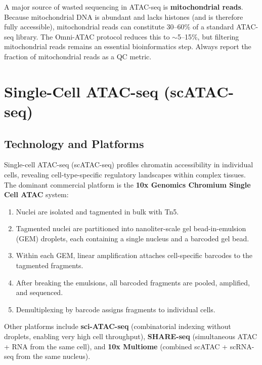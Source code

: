 \begin{warningbox}
A major source of wasted sequencing in ATAC-seq is \textbf{mitochondrial reads}. Because mitochondrial DNA is abundant and lacks histones (and is therefore fully accessible), mitochondrial reads can constitute 30--60\% of a standard ATAC-seq library. The Omni-ATAC protocol reduces this to $\sim$5--15\%, but filtering mitochondrial reads remains an essential bioinformatics step. Always report the fraction of mitochondrial reads as a QC metric.
\end{warningbox}

\section{Single-Cell ATAC-seq (scATAC-seq)}
\label{sec:chromatin:scatac}

\subsection{Technology and Platforms}
\label{subsec:chromatin:scatac-platforms}

Single-cell ATAC-seq (scATAC-seq) profiles chromatin accessibility in individual cells, revealing cell-type-specific regulatory landscapes within complex tissues. The dominant commercial platform is the \textbf{10x Genomics Chromium Single Cell ATAC} system:

\begin{enumerate}[itemsep=2pt]
  \item Nuclei are isolated and tagmented in bulk with Tn5.
  \item Tagmented nuclei are partitioned into nanoliter-scale gel bead-in-emulsion (GEM) droplets, each containing a single nucleus and a barcoded gel bead.
  \item Within each GEM, linear amplification attaches cell-specific barcodes to the tagmented fragments.
  \item After breaking the emulsions, all barcoded fragments are pooled, amplified, and sequenced.
  \item Demultiplexing by barcode assigns fragments to individual cells.
\end{enumerate}

Other platforms include \textbf{sci-ATAC-seq} (combinatorial indexing without droplets, enabling very high cell throughput), \textbf{SHARE-seq} (simultaneous ATAC + RNA from the same cell), and \textbf{10x Multiome} (combined scATAC + scRNA-seq from the same nucleus).

